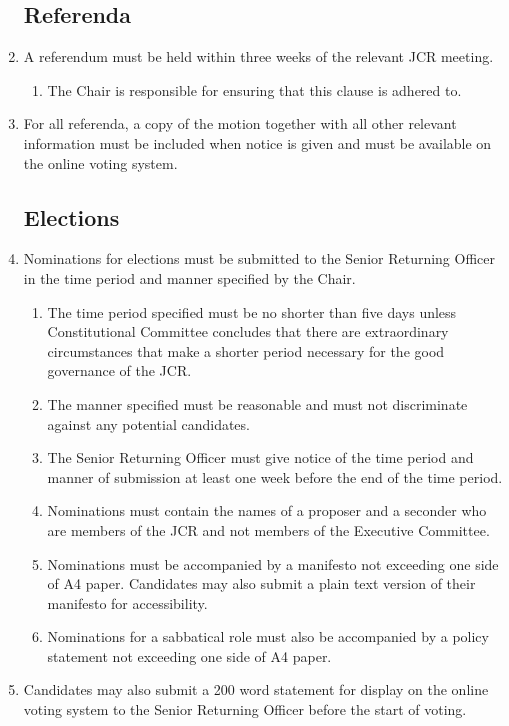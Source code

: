 \documentclass[12pt]{article}  %
\begin{document}
\begin{enumerate}
    \subsection{Referenda}
    \item A referendum must be held within three weeks of the relevant JCR meeting.
    \begin{enumerate}
        \item The Chair is responsible for ensuring that this clause is adhered to.
    \end{enumerate}
    \item For all referenda, a copy of the motion together with all other relevant information must be included when notice is given and must be available on the online voting system.
    \subsection{Elections}
    \item Nominations for elections must be submitted to the Senior Returning Officer in the time period and manner specified by the Chair.
    \begin{enumerate}
        \item The time period specified must be no shorter than five days unless Constitutional Committee concludes that there are extraordinary circumstances that make a shorter period necessary for the good governance of the JCR.
        \item The manner specified must be reasonable and must not discriminate against any potential candidates.
        \item The Senior Returning Officer must give notice of the time period and manner of submission at least one week before the end of the time period.
        \item Nominations must contain the names of a proposer and a seconder who are members of the JCR and not members of the Executive Committee.
        \item Nominations must be accompanied by a manifesto not exceeding one side of A4 paper. Candidates may also submit a plain text version of their manifesto for accessibility.
        \item Nominations for a sabbatical role must also be accompanied by a policy statement not exceeding one side of A4 paper.
    \end{enumerate}
    \item Candidates may also submit a 200 word statement for display on the online voting system to the Senior Returning Officer before the start of voting.

\end{enumerate}
\end{document}
